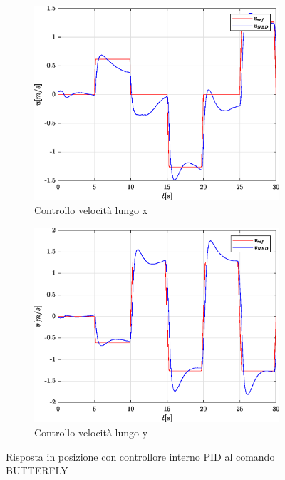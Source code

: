 \begin{figure}
\begin{subfigure}{0.45\textwidth}
		\label{fig:BUTTERFLYerrposyPID}
	\end{subfigure}
	\\
	\begin{subfigure}{0.45\textwidth}
		\centering
		\includegraphics[width=1\textwidth]{Simulazioni/Figure/PID/BUTTERFLY/PositionControlXVel}
		\caption{Controllo velocità lungo x}
		\label{fig:BUTTERFLYerrvelxPID}
	\end{subfigure}
	\hfill
	\begin{subfigure}{0.45\textwidth}
		\centering
		\includegraphics[width=1\textwidth]{Simulazioni/Figure/PID/BUTTERFLY/PositionControlYVel}
		\caption{Controllo velocità lungo y}
		\label{fig:BUTTERFLYerrvelyPID}
	\end{subfigure}
	\caption{Risposta in posizione con controllore interno PID al comando BUTTERFLY}
\end{figure}


